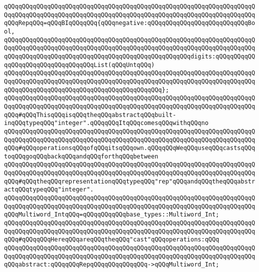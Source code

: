 \newline
\verb|qQQqqQQqqQQqqQQqqQQqqQQqqQQqqQQqqQQqqQQqqQQqqQQqqQQqqQQqqQQqqQQqqQQqqQQqqQQqqQQqqQQqqQQqqQQqqQQqqQQqqQQqqQQqqQQqqQQqqQQqqQQqqQQqqQQqqQQqqQQqqQQqRepqQQq=qQQqBIqQQqqQQq{qQQqnegative:qQQqqQQqqQQqqQQqqQQqqQQqqQQqBool,|\newline
\verb|qQQqqQQqqQQqqQQqqQQqqQQqqQQqqQQqqQQqqQQqqQQqqQQqqQQqqQQqqQQqqQQqqQQqqQQqqQQqqQQqqQQqqQQqqQQqqQQqqQQqqQQqqQQqqQQqqQQqqQQqqQQqqQQqqQQqqQQqqQQqqQQqqQQqqQQqqQQqqQQqqQQqqQQqqQQqqQQqqQQqqQQqqQQqqQQqdigits:qQQqqQQqqQQqqQQqqQQqqQQqqQQqqQQqqQQqList(qQQqUntqQQq)|\newline
\verb|qQQqqQQqqQQqqQQqqQQqqQQqqQQqqQQqqQQqqQQqqQQqqQQqqQQqqQQqqQQqqQQqqQQqqQQqqQQqqQQqqQQqqQQqqQQqqQQqqQQqqQQqqQQqqQQqqQQqqQQqqQQqqQQqqQQqqQQqqQQqqQQqqQQqqQQqqQQqqQQqqQQqqQQqqQQqqQQqqQQqqQQq};|\newline
\newline
\verb|qQQqqQQqqQQqqQQqqQQqqQQqqQQqqQQqqQQqqQQqqQQqqQQqqQQqqQQqqQQqqQQqqQQqqQQqqQQqqQQqqQQqqQQqqQQqqQQqqQQqqQQqqQQqqQQqqQQqqQQqqQQqqQQqqQQqqQQqqQQqqQQq#qQQqThisqQQqisqQQqtheqQQqabstractqQQqbuilt-inqQQqtypeqQQq"integer".qQQqqQQqItqQQqcomesqQQqwithqQQqno|\newline
\verb|qQQqqQQqqQQqqQQqqQQqqQQqqQQqqQQqqQQqqQQqqQQqqQQqqQQqqQQqqQQqqQQqqQQqqQQqqQQqqQQqqQQqqQQqqQQqqQQqqQQqqQQqqQQqqQQqqQQqqQQqqQQqqQQqqQQqqQQqqQQqqQQq#qQQqoperationsqQQqofqQQqitsqQQqown.qQQqqQQqWeqQQquseqQQqcastsqQQqtoqQQqgoqQQqbackqQQqandqQQqforthqQQqbetween|\newline
\verb|qQQqqQQqqQQqqQQqqQQqqQQqqQQqqQQqqQQqqQQqqQQqqQQqqQQqqQQqqQQqqQQqqQQqqQQqqQQqqQQqqQQqqQQqqQQqqQQqqQQqqQQqqQQqqQQqqQQqqQQqqQQqqQQqqQQqqQQqqQQqqQQq#qQQqtheqQQqrepresentationqQQqtypeqQQq"rep"qQQqandqQQqtheqQQqabstractqQQqtypeqQQq"integer".|\newline
\newline
\verb|qQQqqQQqqQQqqQQqqQQqqQQqqQQqqQQqqQQqqQQqqQQqqQQqqQQqqQQqqQQqqQQqqQQqqQQqqQQqqQQqqQQqqQQqqQQqqQQqqQQqqQQqqQQqqQQqqQQqqQQqqQQqqQQqqQQqqQQqqQQqqQQqMultiword_IntqQQq=qQQqqQQqqQQqbase_types::Multiword_Int;|\newline
\newline
\verb|qQQqqQQqqQQqqQQqqQQqqQQqqQQqqQQqqQQqqQQqqQQqqQQqqQQqqQQqqQQqqQQqqQQqqQQqqQQqqQQqqQQqqQQqqQQqqQQqqQQqqQQqqQQqqQQqqQQqqQQqqQQqqQQqqQQqqQQqqQQqqQQq#qQQqqQQqHereqQQqareqQQqtheqQQq"cast"qQQqoperations:qQQq|\newline
\verb|qQQqqQQqqQQqqQQqqQQqqQQqqQQqqQQqqQQqqQQqqQQqqQQqqQQqqQQqqQQqqQQqqQQqqQQqqQQqqQQqqQQqqQQqqQQqqQQqqQQqqQQqqQQqqQQqqQQqqQQqqQQqqQQqqQQqqQQqqQQqqQQqabstract:qQQqqQQqRepqQQqqQQqqQQqqQQq->qQQqMultiword_Int;|\newline
